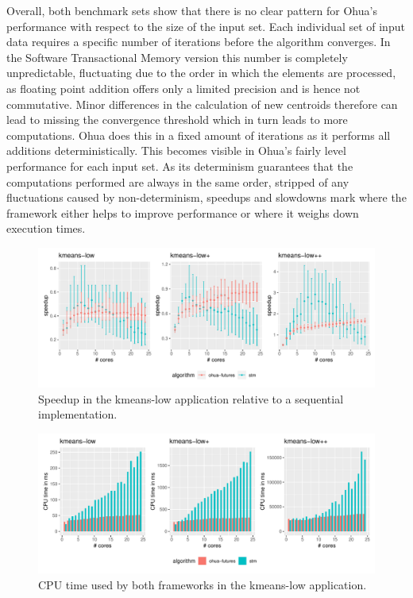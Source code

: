 Overall, both benchmark sets show that there is no clear pattern for Ohua's performance with respect to the size of the input set.
Each individual set of input data requires a specific number of iterations before the algorithm converges.
In the Software Transactional Memory version this number is completely unpredictable, fluctuating due to the order in which the elements are processed, as floating point addition offers only a limited precision and is hence not commutative.
Minor differences in the calculation of new centroids therefore can lead to missing the convergence threshold which in turn leads to more computations.
Ohua does this in a fixed amount of iterations as it performs all additions deterministically.
This becomes visible in Ohua's fairly level performance for each input set.
As its determinism guarantees that the computations performed are always in the same order, stripped of any fluctuations caused by non-determinism, speedups and slowdowns mark where the framework either helps to improve performance or where it weighs down execution times.

\begin{figure}
    \centering
    \includegraphics[width=\textwidth,keepaspectratio]{gfx/results/kmeans-low_comb}
    \caption{Speedup in the kmeans-low application relative to a sequential implementation.}%
    \label{fig:evaluation:kmeans-low}
\end{figure}

\begin{figure}
    \centering
    \includegraphics[width=\textwidth,keepaspectratio]{gfx/results/cpu_kmeans-low_comb}
    \caption{CPU time used by both frameworks in the kmeans-low application.}%
    \label{fig:evaluation:kmeans-low-cpu}
\end{figure}

